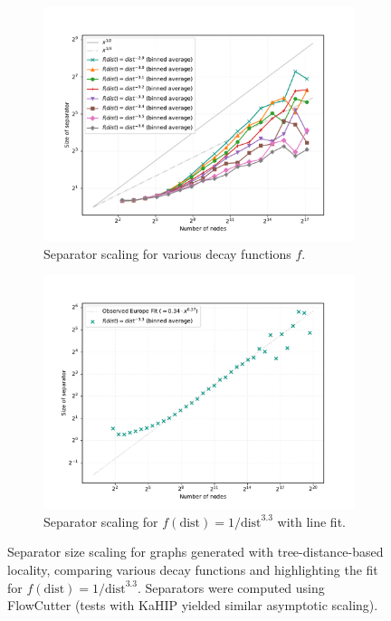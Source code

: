 \begin{figure}[tbhp]
	\centering
	\begin{subfigure}[t]{0.45\linewidth}
		\centering
		\includegraphics[width=\linewidth]{graphics/tree_local_pow_overview.pdf}
		\caption{Separator scaling for various decay functions \(f\).}
		\label{fig:tree_dist_compare_functions}
	\end{subfigure}
	\hfill
	\begin{subfigure}[t]{0.45\linewidth}
		\centering
		\includegraphics[width=\linewidth]{graphics/tree_locality_33_1000000.pdf}
		\caption{Separator scaling for \(f(\text{dist}) = 1/\text{dist}^{3.3}\) with line fit.}
		\label{fig:tree_dist_best_fit_scaling}
	\end{subfigure}
	\caption{Separator size scaling for graphs generated with tree-distance-based locality, comparing various decay functions and highlighting the fit for \(f(\text{dist}) = 1/\text{dist}^{3.3}\). Separators were computed using FlowCutter (tests with KaHIP yielded similar asymptotic scaling).}
	\label{fig:tree_dist_locality_scaling}
\end{figure}

